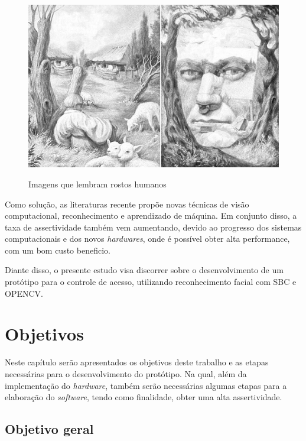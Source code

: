 \begin{figure}[h!]
    \centering
    \caption{Imagens que lembram rostos humanos}
    \includegraphics[scale=0.25]{figuras/pareidolia.jpg} 
    \label{fig:pareidolia}
    \centering
\end{figure}

Como solução, as literaturas recente propõe novas técnicas de visão computacional, 
reconhecimento e aprendizado de máquina. Em conjunto disso, a taxa de assertividade 
também vem aumentando, devido ao progresso dos sistemas computacionais e dos 
novos \textit{hardwares}, onde é possível obter alta performance, com um 
bom custo beneficio.

Diante disso, o presente estudo visa discorrer sobre o desenvolvimento de um protótipo 
para o controle de acesso, utilizando reconhecimento facial com SBC e OPENCV.

\section{Objetivos}\label{sec:objetivos}

Neste capítulo serão apresentados os objetivos deste trabalho e as etapas necessárias 
para o desenvolvimento do protótipo. Na qual, além da implementação do 
\textit{hardware}, também serão necessárias algumas etapas para a elaboração do \textit{software}, 
tendo como finalidade, obter uma alta assertividade.

\subsection{Objetivo geral}\label{subsec:objetivoGeral}

